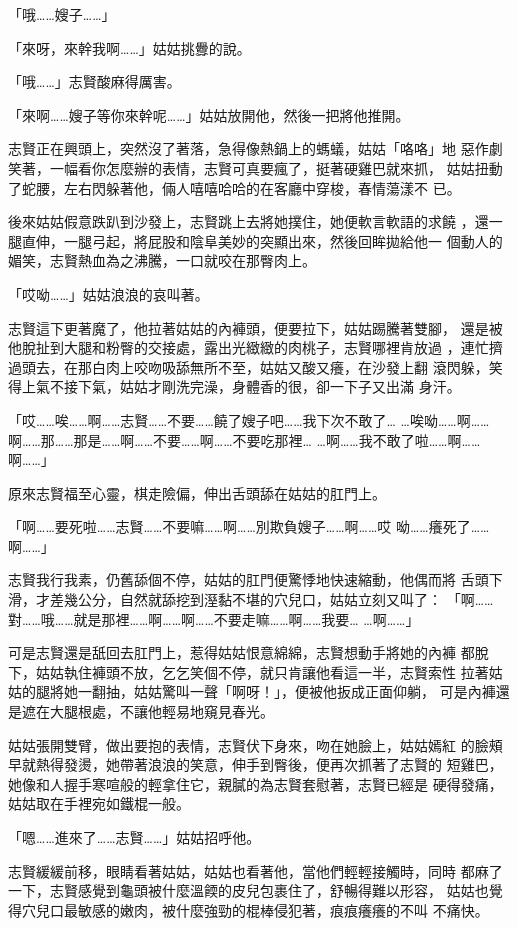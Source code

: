 「哦……嫂子……」

「來呀，來幹我啊……」姑姑挑釁的說。

「哦……」志賢酸麻得厲害。

「來啊……嫂子等你來幹呢……」姑姑放開他，然後一把將他推開。

志賢正在興頭上，突然沒了著落，急得像熱鍋上的螞蟻，姑姑「咯咯」地
惡作劇笑著，一幅看你怎麼辦的表情，志賢可真要瘋了，挺著硬雞巴就來抓，
姑姑扭動了蛇腰，左右閃躲著他，倆人嘻嘻哈哈的在客廳中穿梭，春情蕩漾不
已。

後來姑姑假意跌趴到沙發上，志賢跳上去將她撲住，她便軟言軟語的求饒
，還一腿直伸，一腿弓起，將屁股和陰阜美妙的突顯出來，然後回眸拋給他一
個動人的媚笑，志賢熱血為之沸騰，一口就咬在那臀肉上。

「哎呦……」姑姑浪浪的哀叫著。

志賢這下更著魔了，他拉著姑姑的內褲頭，便要拉下，姑姑踢騰著雙腳，
還是被他脫扯到大腿和粉臀的交接處，露出光緻緻的肉桃子，志賢哪裡肯放過
，連忙擠過頭去，在那白肉上咬吻吸舔無所不至，姑姑又酸又癢，在沙發上翻
滾閃躲，笑得上氣不接下氣，姑姑才剛洗完澡，身體香的很，卻一下子又出滿
身汗。

「哎……唉……啊……志賢……不要……饒了嫂子吧……我下次不敢了…
…唉呦……啊……啊……那……那是……啊……不要……啊……不要吃那裡…
…啊……我不敢了啦……啊……啊……」

原來志賢福至心靈，棋走險偏，伸出舌頭舔在姑姑的肛門上。

「啊……要死啦……志賢……不要嘛……啊……別欺負嫂子……啊……哎
呦……癢死了……啊……」

志賢我行我素，仍舊舔個不停，姑姑的肛門便驚悸地快速縮動，他偶而將
舌頭下滑，才差幾公分，自然就舔挖到溼黏不堪的穴兒口，姑姑立刻又叫了：
「啊……對……哦……就是那裡……啊……啊……不要走嘛……啊……我要…
…啊……」

可是志賢還是舐回去肛門上，惹得姑姑恨意綿綿，志賢想動手將她的內褲
都脫下，姑姑執住褲頭不放，乞乞笑個不停，就只肯讓他看這一半，志賢索性
拉著姑姑的腿將她一翻抽，姑姑驚叫一聲「啊呀！」，便被他扳成正面仰躺，
可是內褲還是遮在大腿根處，不讓他輕易地窺見春光。

姑姑張開雙臂，做出要抱的表情，志賢伏下身來，吻在她臉上，姑姑嫣紅
的臉頰早就熱得發燙，她帶著浪浪的笑意，伸手到臀後，便再次抓著了志賢的
短雞巴，她像和人握手寒喧般的輕拿住它，親膩的為志賢套慰著，志賢已經是
硬得發痛，姑姑取在手裡宛如鐵棍一般。

「嗯……進來了……志賢……」姑姑招呼他。

志賢緩緩前移，眼睛看著姑姑，姑姑也看著他，當他們輕輕接觸時，同時
都麻了一下，志賢感覺到龜頭被什麼溫餪的皮兒包裹住了，舒暢得難以形容，
姑姑也覺得穴兒口最敏感的嫩肉，被什麼強勁的棍棒侵犯著，痕痕癢癢的不叫
不痛快。

